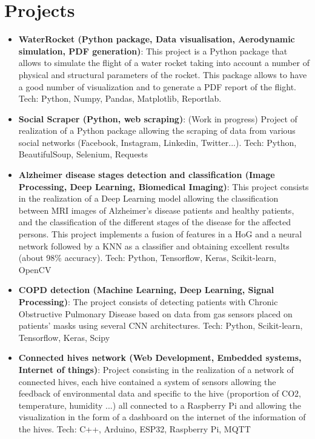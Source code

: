 \documentclass[a4paper,20pt]{article}
\newcommand{\resumeItem}[2]{
  \item\small{
    \textbf{#1}{: #2 \vspace{-2pt}}
  }
}
\newcommand{\resumeSubItem}[2]{\resumeItem{#1}{#2}\vspace{-3pt}}
\newcommand{\resumeSubHeadingListStart}{\begin{itemize}[leftmargin=*]}
\newcommand{\resumeSubHeadingListEnd}{\end{itemize}}
\begin{document}
\section{Projects}
  \resumeSubHeadingListStart
    \resumeSubItem{WaterRocket (Python package, Data visualisation, Aerodynamic simulation, PDF generation)}{This project is a Python package that allows to simulate the flight of a water rocket taking into account a number of physical and structural parameters of the rocket. This package allows to have a good number of visualization and to generate a PDF report of the flight. Tech: Python, Numpy, Pandas, Matplotlib, Reportlab.}
    \vspace{2pt}
    \resumeSubItem{Social Scraper (Python, web scraping)}{(Work in progress) Project of realization of a Python package allowing the scraping of data from various social networks (Facebook, Instagram, Linkedin, Twitter...). Tech: Python, BeautifulSoup, Selenium, Requests}
    \vspace{2pt}
    \resumeSubItem{Alzheimer disease stages detection and classification (Image Processing, Deep Learning, Biomedical Imaging)}{This project consists in the realization of a Deep Learning model allowing the classification between MRI images of Alzheimer's disease patients and healthy patients, and the classification of the different stages of the disease for the affected persons. This project implements a fusion of features in a HoG and a neural network followed by a KNN as a classifier and obtaining excellent results (about 98\% accuracy). Tech: Python, Tensorflow, Keras, Scikit-learn, OpenCV}
    \vspace{2pt}
    \resumeSubItem{COPD detection (Machine Learning, Deep Learning, Signal Processing)}{The project consists of detecting patients with Chronic Obstructive Pulmonary Disease based on data from gas sensors placed on patients' masks using several CNN architectures. Tech: Python, Scikit-learn, Tensorflow, Keras, Scipy}
    \vspace{2pt}
    \resumeSubItem{Connected hives network (Web Development, Embedded systems, Internet of things)}{Project consisting in the realization of a network of connected hives, each hive contained a system of sensors allowing the feedback of environmental data and specific to the hive (proportion of CO2, temperature, humidity ...) all connected to a Raspberry Pi and allowing the visualization in the form of a dashboard on the internet of the information of the hives. Tech: C++, Arduino, ESP32, Raspberry Pi, MQTT}
  \resumeSubHeadingListEnd
\vspace{-5pt}
\end{document}
